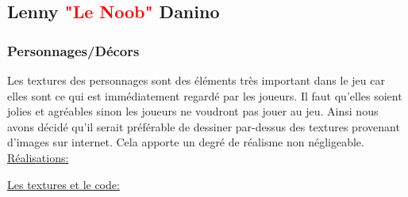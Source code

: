 \documentclass{article}
\begin{document}
\subsection{Lenny \textcolor{red}{"Le Noob"} Danino}
\subsubsection{Personnages/Décors}

\par
Les textures des personnages sont des éléments très important dans le jeu car elles sont ce qui est immédiatement regardé par les joueurs. Il faut qu’elles soient jolies et agréables sinon les joueurs ne voudront pas jouer au jeu. Ainsi nous avons décidé qu’il serait préférable de dessiner par-dessus des textures provenant d’images sur internet. Cela apporte un degré de réalisme non négligeable.
\newline
\newline
\underline{Réalisations:}

\par
\underline{Les textures et le code:}
\newline
\end{document}
